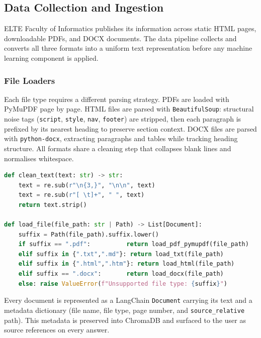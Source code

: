 \subsection{Data Collection and Ingestion}
\label{sec:impl-data}

ELTE Faculty of Informatics publishes its information across static HTML pages,
downloadable PDFs, and DOCX documents. The data pipeline collects and converts
all three formats into a uniform text representation before any machine learning
component is applied.

\subsubsection{File Loaders}

Each file type requires a different parsing strategy. PDFs are loaded with
PyMuPDF page by page. HTML files are parsed with \texttt{BeautifulSoup}:
structural noise tags (\texttt{script}, \texttt{style}, \texttt{nav},
\texttt{footer}) are stripped, then each paragraph is prefixed by its nearest
heading to preserve section context. DOCX files are parsed with
\texttt{python-docx}, extracting paragraphs and tables while tracking heading
structure. All formats share a cleaning step that collapses blank lines and
normalises whitespace.

\begin{lstlisting}[language=Python]
def clean_text(text: str) -> str:
    text = re.sub(r"\n{3,}", "\n\n", text)
    text = re.sub(r"[ \t]+", " ", text)
    return text.strip()

def load_file(file_path: str | Path) -> List[Document]:
    suffix = Path(file_path).suffix.lower()
    if suffix == ".pdf":          return load_pdf_pymupdf(file_path)
    elif suffix in {".txt",".md"}: return load_txt(file_path)
    elif suffix in {".html",".htm"}: return load_html(file_path)
    elif suffix == ".docx":       return load_docx(file_path)
    else: raise ValueError(f"Unsupported file type: {suffix}")
\end{lstlisting}

Every document is represented as a LangChain \texttt{Document} carrying its
text and a metadata dictionary (file name, file type, page number, and
\texttt{source\_relative} path). This metadata is preserved into ChromaDB and
surfaced to the user as source references on every answer.

